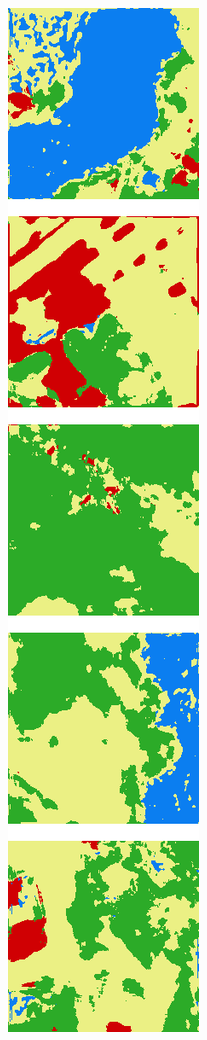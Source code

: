 \begin{figure}[h]
\begin{subfigure}{\DensenetPredictionsImageWidth}
        \caption{}
        \label{fig:densenet_pred_56d}
    \end{subfigure} \hspace{1mm}
    \begin{subfigure}{\DensenetPredictionsImageWidth}
        \includegraphics[width=\textwidth]{images/densenet/67d}

\end{subfigure}
\end{figure}
